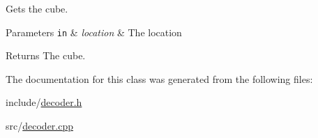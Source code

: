 Gets the cube. 


\begin{DoxyParams}[1]{Parameters}
\mbox{\tt in}  & {\em location} & The location \\
\hline
\end{DoxyParams}
\begin{DoxyReturn}{Returns}
The cube. 
\end{DoxyReturn}


The documentation for this class was generated from the following files\+:\begin{DoxyCompactItemize}
\item 
include/\hyperlink{decoder_8h}{decoder.\+h}\item 
src/\hyperlink{decoder_8cpp}{decoder.\+cpp}\end{DoxyCompactItemize}
